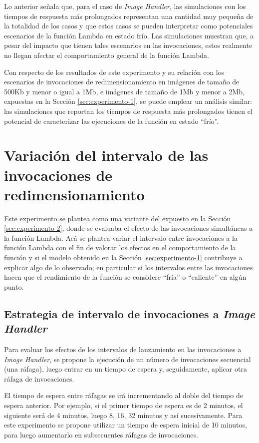 Lo anterior señala que, para el caso de \emph{Image Handler}, las simulaciones con los tiempos de respuesta más prolongados representan una cantidad muy pequeña de la totalidad de los casos y que estos casos se pueden interpretar como potenciales escenarios de la función Lambda en estado frío. Las simulaciones muestran que, a pesar del impacto que tienen tales escenarios en las invocaciones, estos realmente no llegan afectar el comportamiento general de la función Lambda. 

Con respecto de los resultados de este experimento y su relación con los escenarios de invocaciones de redimensionamiento en imágenes de tamaño de 500Kb y menor o igual a 1Mb, e imágenes de tamaño de 1Mb y menor a 2Mb, expuestas en la Sección \ref{sec:experimento-1}, se puede emplear un análisis similar: las simulaciones que reportan los tiempos de respuesta más prolongados tienen el potencial de caracterizar las ejecuciones de la función en estado ``frío''.

\section{Variación del intervalo de las invocaciones de redimensionamiento}\label{sec:experimento-3}

Este experimento se plantea como una variante del expuesto en la Sección \ref{sec:experimento-2}, donde se evaluaba el efecto de las invocaciones simultáneas a la función Lambda. Acá se plantea variar el intervalo entre invocaciones a la función Lambda con el fin de valorar los efectos en el comportamiento de la función y si el modelo obtenido en la Sección \ref{sec:experimento-1} contribuye a explicar algo de lo observado; en particular si los intervalos entre las invocaciones hacen que el rendimiento de la función se considere ``fría'' o ``caliente'' en algún punto.

\subsection{Estrategia de intervalo de invocaciones a \emph{Image Handler}}
Para evaluar los efectos de los intervalos de lanzamiento en las invocaciones a \emph{Image Handler}, se propone la ejecución de un número de invocaciones secuencial (una ráfaga), luego entrar en un tiempo de espera y, seguidamente, aplicar otra ráfaga de invocaciones. 

El tiempo de espera entre ráfagas se irá incrementando al doble del tiempo de espera anterior. Por ejemplo, si el primer tiempo de espera es de 2 minutos, el siguiente será de 4 minutos, luego 8, 16, 32 minutos y así sucesivamente. Para este experimento se propone utilizar un tiempo de espera inicial de 10 minutos, para luego aumentarlo en subsecuentes ráfagas de invocaciones.

